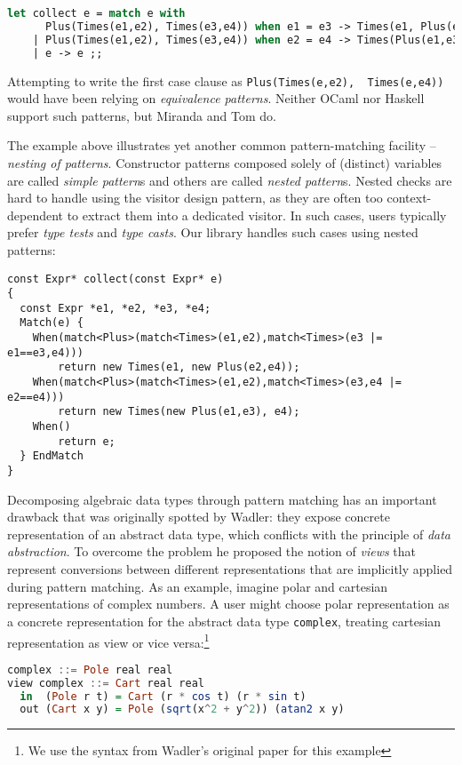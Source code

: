 \documentclass{llncs}
\DeclareRobustCommand{\codeocaml}[1]{{\lstinline[breaklines=false,language=Caml]{#1}}}
\begin{document}
\begin{lstlisting}[language=Caml,keepspaces,columns=flexible]
let collect e = match e with
      Plus(Times(e1,e2), Times(e3,e4)) when e1 = e3 -> Times(e1, Plus(e2,e4))
    | Plus(Times(e1,e2), Times(e3,e4)) when e2 = e4 -> Times(Plus(e1,e3), e4)
    | e -> e ;;
\end{lstlisting}

\noindent
Attempting to write the first case clause as \codeocaml{Plus(Times(e,e2), 
Times(e,e4))} would have been relying on \emph{equivalence patterns}. 
Neither OCaml nor Haskell support such patterns, but
Miranda\cite{Miranda85} and Tom\cite{Moreau:2003} do.

The example above illustrates yet another common pattern-matching facility -- 
\emph{nesting of patterns}. Constructor patterns composed 
solely of (distinct) variables are called \emph{simple pattern}s
and others are called \emph{nested pattern}s.
Nested checks are hard to handle using the visitor design pattern, as they are often 
too context-dependent to extract them into a dedicated visitor. 
In such cases, users typically prefer \emph{type tests} and \emph{type 
casts}. Our library handles such cases using nested patterns:
\begin{lstlisting}
const Expr* collect(const Expr* e)
{
  const Expr *e1, *e2, *e3, *e4;
  Match(e) {
    When(match<Plus>(match<Times>(e1,e2),match<Times>(e3 |= e1==e3,e4))) 
        return new Times(e1, new Plus(e2,e4));
    When(match<Plus>(match<Times>(e1,e2),match<Times>(e3,e4 |= e2==e4))) 
        return new Times(new Plus(e1,e3), e4);
    When() 
        return e;
  } EndMatch
}
\end{lstlisting}

\noindent
Decomposing algebraic data types through pattern matching has an important 
drawback that was originally spotted by Wadler\cite{Wadler87}: they expose 
concrete representation of an abstract data type, which conflicts with the 
principle of \emph{data abstraction}. To overcome the problem he proposed the 
notion of \emph{views} that represent conversions between different 
representations that are implicitly applied during pattern matching. As an 
example, imagine polar and cartesian representations of complex numbers. A user 
might choose polar representation as a concrete representation for the abstract 
data type \codeocaml{complex}, treating cartesian representation as view or vice 
versa:\footnote{We use the syntax from Wadler's original paper for this example}

\begin{lstlisting}[language=Haskell,columns=flexible]
complex ::= Pole real real
view complex ::= Cart real real
  in  (Pole r t) = Cart (r * cos t) (r * sin t)
  out (Cart x y) = Pole (sqrt(x^2 + y^2)) (atan2 x y)
\end{lstlisting}
\end{document}
